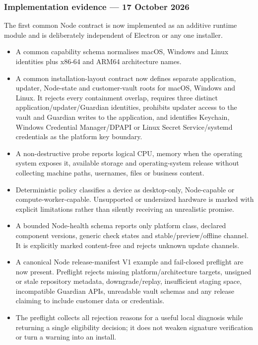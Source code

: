 \documentclass[11pt]{article}
\begin{document}
\subsubsection*{Implementation evidence --- 17 October 2026}

The first common Node contract is now implemented as an additive runtime module and is deliberately independent of Electron or any one installer.

\begin{itemize}
  \item A common capability schema normalises macOS, Windows and Linux identities plus x86-64 and ARM64 architecture names.
  \item A common installation-layout contract now defines separate application, updater, Node-state and customer-vault roots for macOS, Windows and Linux. It rejects every containment overlap, requires three distinct application/updater/Guardian identities, prohibits updater access to the vault and Guardian writes to the application, and identifies Keychain, Windows Credential Manager/DPAPI or Linux Secret Service/systemd credentials as the platform key boundary.
  \item A non-destructive probe reports logical CPU, memory when the operating system exposes it, available storage and operating-system release without collecting machine paths, usernames, files or business content.
  \item Deterministic policy classifies a device as desktop-only, Node-capable or compute-worker-capable. Unsupported or undersized hardware is marked with explicit limitations rather than silently receiving an unrealistic promise.
  \item A bounded Node-health schema reports only platform class, declared component versions, generic check states and stable/preview/offline channel. It is explicitly marked content-free and rejects unknown update channels.
  \item A canonical Node release-manifest V1 example and fail-closed preflight are now present. Preflight rejects missing platform/architecture targets, unsigned or stale repository metadata, downgrade/replay, insufficient staging space, incompatible Guardian APIs, unreadable vault schemas and any release claiming to include customer data or credentials.
  \item The preflight collects all rejection reasons for a useful local diagnosis while returning a single eligibility decision; it does not weaken signature verification or turn a warning into an install.

\end{itemize}
\end{document}
